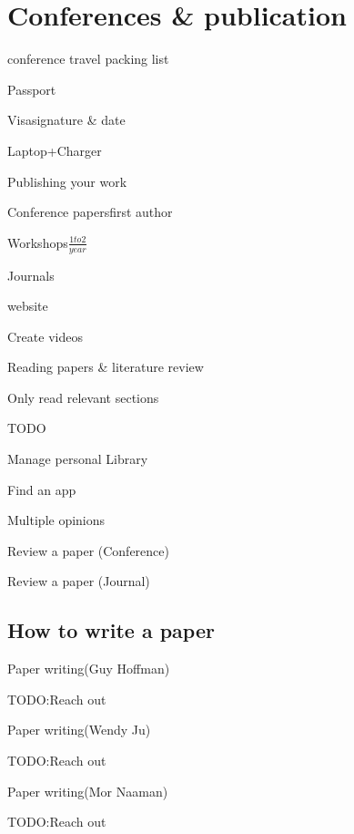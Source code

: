 \section{Conferences \& publication}

\begin{checklist}{conference travel packing list}
\item{Passport}{}
\item{Visa}{signature \& date}
\item{Laptop}{+Charger}
\end{checklist}

\begin{checklist}{Publishing your work}
\item{Conference papers}{first author}
\item{Workshops}{$\frac{1 to 2}{year} $}
\item{Journals}{}
\item{website}{}
\item{Create videos}{}
\end{checklist}

\begin{checklist}{Reading papers \& literature review}
\item{Only read relevant sections}{}
\item{TODO}{}
\end{checklist}

\begin{checklist}{Manage personal Library}
\item{Find an app}{}
\item{Multiple opinions}{}
\end{checklist}

\begin{checklist}{Review a paper (Conference)}
\item{}{}
\item{}{}
\end{checklist}

\begin{checklist}{Review a paper (Journal)}
\item{}{}
\item{}{}
\end{checklist}

\subsection{How to write a paper}
\begin{checklist}{Paper writing(Guy Hoffman)}
\item{TODO:}{Reach out}
\end{checklist}
\begin{checklist}{Paper writing(Wendy Ju)}
\item{TODO:}{Reach out}
\end{checklist}

\begin{checklist}{Paper writing(Mor Naaman)}
\item{TODO:}{Reach out}
\end{checklist}